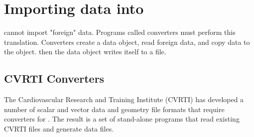 %
%
%
%
%

\section{Importing data into \sr{}}
\label{sec:import} 

\sr{} cannot import "foreign" data. Programs called converters must perform this translation. Converters create a \sr{} data object, read foreign data, and copy data to the object. then the \sr{} data object writes itself to a file.

\subsection{CVRTI Converters}

The Cardiovascular Research and Training Institute (CVRTI) has developed a
number of scalar and vector data and geometry file formats that require
converters for \sr{}.  The result is a set of stand-alone programs that read
existing CVRTI files and generate \sr{} data files.


